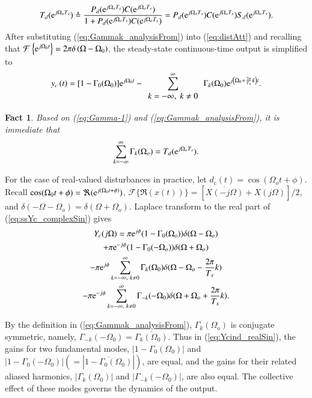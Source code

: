 \documentclass [11pt, proquest] {uwthesis}[2020/02/24]
\newtheorem{fact}{Fact}
\begin{document}
\noindent
\begin{equation}
T_{d}(\mathrm{e}^{j\Omega_{o}T_{s}})\triangleq\frac{P_{d}(\mathrm{e}^{j\Omega_{o}T_{s}})C(\mathrm{e}^{j\Omega_{o}T_{s}})}{1+P_{d}(\mathrm{e}^{j\Omega_{o}T_{s}})C(\mathrm{e}^{j\Omega_{o}T_{s}})}=P_{d}(\mathrm{e}^{j\Omega_{o}T_{s}})C(\mathrm{e}^{j\Omega_{o}T_{s}})S_{d}(\mathrm{e}^{j\Omega_{o}T_{s}}).\label{eq:Td}
\end{equation}
After substituting (\ref{eq:Gammak_analysisFrom}) into (\ref{eq:distAtt})
and recalling that $\mathcal{F}\left\{ \mathrm{e}^{j\Omega_{0}t}\right\} =2\pi\delta\left(\Omega-\Omega_{0}\right)$,
the steady-state continuous-time output is simplified to
\begin{equation}
y_{c}\left(t\right)=[1-\Gamma_{0}(\Omega_{0})]\e^{j\Omega_{0}t}-\sum_{\begin{array}{c}
k=-\infty,\ k\neq0\end{array}}^{\infty}\Gamma_{k}(\Omega_{0})\e^{j\left(\Omega_{0}+\frac{2\pi}{T_{s}}k\right)t}.\label{eq:ssYc_complexSin}
\end{equation}

\begin{fact}\label{fact_1}Based on (\ref{eq:Gamma-1}) and (\ref{eq:Gammak_analysisFrom}),
it is immediate that
\begin{equation}
\sum_{k=-\infty}^{\infty}\Gamma_{k}(\Omega_{o})=T_{d}(\mathrm{e}^{j\Omega_{o}T_{s}}).\label{eq:summation_of_gammark}
\end{equation}
\end{fact}

For the case of real-valued disturbances in practice, let $d_{c}(t)=\cos(\Omega_{o}t+\phi)$.
Recall $\cos(\Omega_{0}t+\phi)=\Re(\mathrm{e}^{j(\Omega_{0}t+\phi)})$, $\mathcal{F}\{\Re(x(t))\}=[\overline{X(-j\Omega)}+X(j\Omega)]/2$,
and $\delta(-\Omega-\Omega_{o})=\delta(\Omega+\Omega_{o})$. Laplace
transform to the real part of (\ref{eq:ssYc_complexSin}) gives
\begin{multline}
Y_{c}(j\Omega)=\pi\e^{j\phi}(1-\Gamma_{0}(\Omega_{o}))\delta(\Omega-\Omega_{o})\\
+\pi\e^{-j\phi}(1-\Gamma_{0}(-\Omega_{o}))\delta(\Omega+\Omega_{o})\\
-\pi\e^{j\phi}\sum_{k=-\infty,\ k\neq0}^{\infty}\Gamma_{k}(\Omega_{0})\delta(\Omega-\Omega_{o}-\frac{2\pi}{T_{s}}k)\\
-\pi\e^{-j\phi}\sum_{k=-\infty,\ k\neq0}^{\infty}\Gamma_{-k}(-\Omega_{0})\delta(\Omega+\Omega_{o}+\frac{2\pi}{T_{s}}k).\label{eq:Ycind_realSin}
\end{multline}

By the definition in (\ref{eq:Gammak_analysisFrom}), $\Gamma_{k}(\Omega_{o})$
is conjugate symmetric, namely, $\Gamma_{-k}(-\Omega_{0})=\overline{\Gamma_{k}(\Omega_{0})}$.
Thus in (\ref{eq:Ycind_realSin}), the gains for two fundamental modes,
$\left|1-\Gamma_{0}(\Omega_{0})\right|$ and $\left|1-\Gamma_{0}(-\Omega_{0})\right|\left(=\left|\overline{1-\Gamma_{0}(\Omega_{0})}\right|\right)$,
are equal, and the gains for their related aliased harmonics, $\left|\Gamma_{k}(\Omega_{0})\right|$
and $\left|\Gamma_{-k}(-\Omega_{0})\right|$, are also equal. The
collective effect of these modes governs the dynamics of the output.
\end{document}
